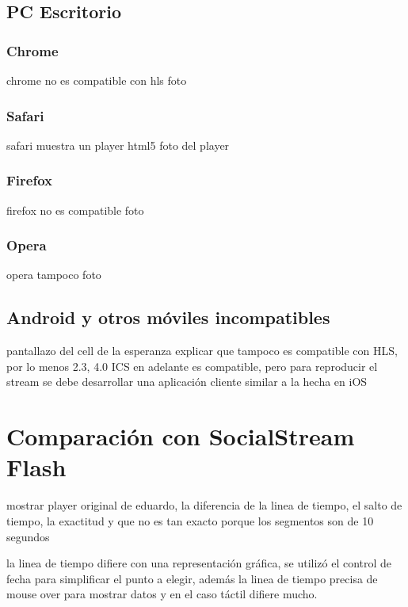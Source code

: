   \subsection{PC Escritorio}
    \subsubsection{Chrome}
    chrome no es compatible con hls
    foto
    \subsubsection{Safari}
    safari muestra un player html5
    foto del player
    \subsubsection{Firefox}
    firefox no es compatible
    foto
    \subsubsection{Opera}
    opera tampoco
    foto
  \subsection{Android y otros móviles incompatibles}
  pantallazo del cell de la esperanza
  explicar que tampoco es compatible con HLS, por lo menos 2.3, 4.0 ICS en adelante es compatible, pero para reproducir el stream se debe desarrollar una aplicación cliente similar a la hecha en iOS
\section{Comparación con SocialStream Flash}
mostrar player original de eduardo, la diferencia de la linea de tiempo, el salto de tiempo, la exactitud y que no es tan exacto porque los segmentos son de 10 segundos

la linea de tiempo difiere con una representación gráfica, se utilizó el control de fecha para simplificar el punto a elegir, además la linea de tiempo precisa de mouse over para mostrar datos y en el caso táctil difiere mucho.


